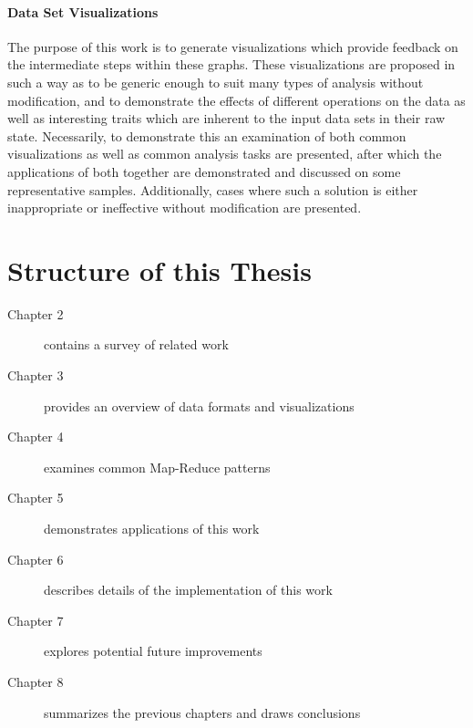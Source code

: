 \paragraph{Data Set Visualizations}
The purpose of this work is to generate visualizations which provide feedback on the intermediate steps within these graphs. These visualizations are proposed in such a way as to be generic enough to suit many types of analysis without modification, and to demonstrate the effects of different operations on the data as well as interesting traits which are inherent to the input data sets in their raw state. Necessarily, to demonstrate this an examination of both common visualizations as well as common analysis tasks are presented, after which the applications of both together are demonstrated and discussed on some representative samples. Additionally, cases where such a solution is either inappropriate or ineffective without modification are presented.


\section{Structure of this Thesis}

\begin{description}
\item[Chapter 2] contains a survey of related work
\item[Chapter 3] provides an overview of data formats and visualizations
\item[Chapter 4] examines common Map-Reduce patterns
\item[Chapter 5] demonstrates applications of this work
\item[Chapter 6] describes details of the implementation of this work
\item[Chapter 7] explores potential future improvements
\item[Chapter 8] summarizes the previous chapters and draws conclusions
\end{description}
